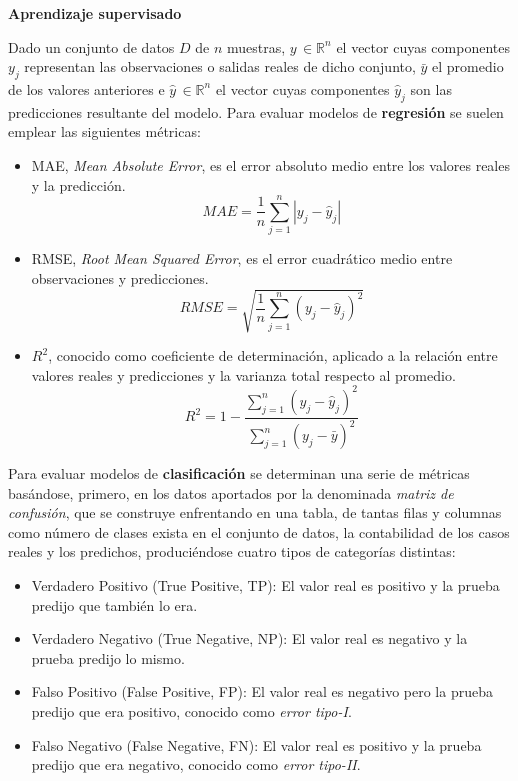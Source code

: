 \documentclass[00-Trabajo_Final.tex]{subfiles}
\begin{document}
\vspace{1em}

\textbf{Aprendizaje supervisado}

\vspace{.5em}

Dado un conjunto de datos $D$ de $n$ muestras, $y\,\in\mathbb{R}^n$ el vector cuyas componentes $y_j$ representan las observaciones o salidas reales de dicho conjunto, $\bar{y}$ el promedio de los valores anteriores e $\hat{y}\,\in\mathbb{R}^n$ el vector cuyas componentes $\hat{y}_j$ son las predicciones resultante del modelo. Para evaluar modelos de \textbf{regresión} se suelen emplear las siguientes métricas:

\begin{itemize}[noitemsep]
    \item MAE, \textit{Mean Absolute Error}, es el error absoluto medio entre los valores reales y la predicción.
    \[MAE = \frac{1}{n} \sum_{j=1}^n |y_j - \hat{y}_j|\]
    \item RMSE, \textit{Root Mean Squared Error}, es el error cuadrático medio entre observaciones y predicciones.
    \[RMSE = \sqrt{\frac{1}{n} \sum_{j=1}^n (y_j - \hat{y}_j)^2}\]
    \item $R^2$, conocido como coeficiente de determinación, aplicado a la relación entre valores reales y predicciones y la varianza total respecto al promedio.
    \[R^2 = 1 - \frac{\sum_{j=1}^n (y_j - \hat{y}_j)^2}{\sum_{j=1}^n (y_j - \bar{y})^2}\]
\end{itemize}

\vspace{0.5em}

Para evaluar modelos de \textbf{clasificación} se determinan una serie de métricas basándose, primero, en los datos aportados por la denominada \textit{matriz de confusión}, que se construye enfrentando en una tabla, de tantas filas y columnas como número de clases exista en el conjunto de datos, la contabilidad de los casos reales y los predichos, produciéndose cuatro tipos de categorías distintas:

\begin{itemize}[noitemsep]
    \item Verdadero Positivo (True Positive, TP): El valor real es positivo y la prueba predijo que también lo era.
    \item Verdadero Negativo (True Negative, NP): El valor real es negativo y la prueba predijo lo mismo.
    \item Falso Positivo (False Positive, FP): El valor real es negativo pero la prueba predijo que era positivo, conocido como \textit{error tipo-I}. 
    \item Falso Negativo (False Negative, FN): El valor real es positivo y la prueba predijo que era negativo, conocido como \textit{error tipo-II}.
\end{itemize}
\end{document}
